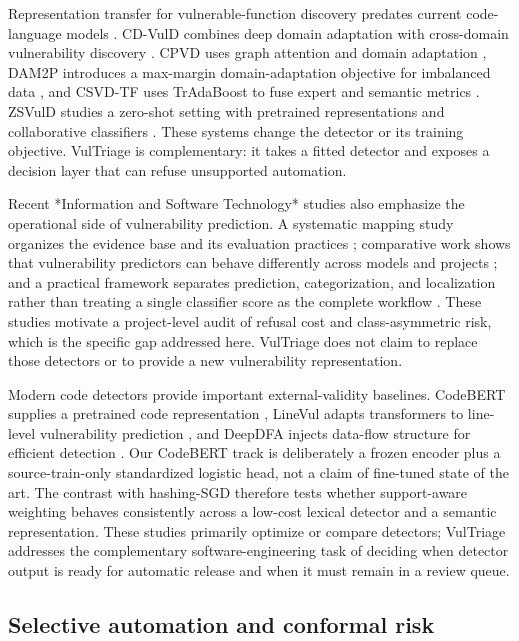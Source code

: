 \documentclass[preprint,12pt]{elsarticle}
\newcommand{\method}{VulTriage\xspace}
\begin{document}
Representation transfer for vulnerable-function discovery predates current code-language models \cite{lin2018transfer}. CD-VulD combines deep domain adaptation with cross-domain vulnerability discovery \cite{liu2022cdvuld}. CPVD uses graph attention and domain adaptation \cite{zhang2023cpvd}, DAM2P introduces a max-margin domain-adaptation objective for imbalanced data \cite{nguyen2024dam2p}, and CSVD-TF uses TrAdaBoost to fuse expert and semantic metrics \cite{cai2024csvdtf}. ZSVulD studies a zero-shot setting with pretrained representations and collaborative classifiers \cite{haque2026zsvuld}. These systems change the detector or its training objective. \method is complementary: it takes a fitted detector and exposes a decision layer that can refuse unsupported automation.

Recent *Information and Software Technology* studies also emphasize the operational side of vulnerability prediction. A systematic mapping study organizes the evidence base and its evaluation practices \cite{kalouptsoglou2023mapping}; comparative work shows that vulnerability predictors can behave differently across models and projects \cite{theisen2020better}; and a practical framework separates prediction, categorization, and localization rather than treating a single classifier score as the complete workflow \cite{liu2024practical}. These studies motivate a project-level audit of refusal cost and class-asymmetric risk, which is the specific gap addressed here. \method does not claim to replace those detectors or to provide a new vulnerability representation.

Modern code detectors provide important external-validity baselines. CodeBERT supplies a pretrained code representation \cite{feng2020codebert}, LineVul adapts transformers to line-level vulnerability prediction \cite{fu2022linevul}, and DeepDFA injects data-flow structure for efficient detection \cite{steenhoek2024deepdfa}. Our CodeBERT track is deliberately a frozen encoder plus a source-train-only standardized logistic head, not a claim of fine-tuned state of the art. The contrast with hashing-SGD therefore tests whether support-aware weighting behaves consistently across a low-cost lexical detector and a semantic representation. These studies primarily optimize or compare detectors; \method addresses the complementary software-engineering task of deciding when detector output is ready for automatic release and when it must remain in a review queue.

\subsection{Selective automation and conformal risk}
\end{document}
